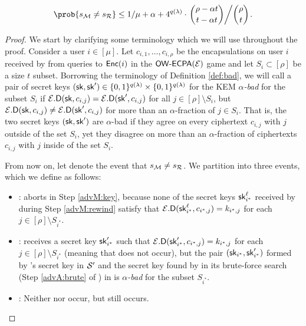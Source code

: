 \begin{lemma}\label{lemma:M}
  \begin{equation}
    \prob{s_{\redM} \ne s_{\redR}}
    \le 1/\mu + \alpha
    + 4^{q(\lambda)} \cdot \left. \binom{\rho - \alpha t}{t - \alpha t} \middle/ \binom{\rho}{t} \right..
  \end{equation}
\end{lemma}

\begin{proof}
  We start by clarifying some terminology which we will use throughout the proof.
  Consider a user \(i \in [\mu]\). Let \(c_{i,1}, \ldots, c_{i,\rho}\) be the encapsulations
  on user \(i\) received by \advA from queries to \(\mathsf{Enc}(i)\) in the
  \(\mathsf{OW}\text{-}\mathsf{ECPA}(\mathcal{E})\) game and let \(S_{i} \subset [\rho]\) be a size \(t\) subset.
  Borrowing the terminology of Definition \ref{def:bad},
  we will call a pair of secret keys \((\mathsf{sk}, \mathsf{sk}') \in \{0,1\}^{q(\lambda)} \times \{0,1\}^{q(\lambda)}\) for the KEM \KEM
  \emph{\(\alpha\)-bad} for the subset \(S_{i}\) if \(\mathcal{E}.\mathsf{D}(\mathsf{sk}, c_{i,j}) = \mathcal{E}.\mathsf{D}(\mathsf{sk}', c_{i,j})\)
  for all \(j \in [\rho] \setminus S_{i}\),
  but \(\mathcal{E}.\mathsf{D}(\mathsf{sk}, c_{i,j}) \ne \mathcal{E}.\mathsf{D}(\mathsf{sk}', c_{i,j})\) for more than an \(\alpha\)-fraction of \(j \in S_{i}\).
  That is, the two secret keys \((\mathsf{sk},\mathsf{sk}')\) are \(\alpha\)-bad if they agree
  on every ciphertext \(c_{i,j}\) with \(j\) outside of the set \(S_{i}\),
  yet they disagree on more than an \(\alpha\)-fraction of ciphertexts
  \(c_{i,j}\) with \(j\) inside of the set \(S_{i}\).

  From now on, let \eventE denote the event that \(s_{\redM} \ne s_{\redR}\).
  We partition \eventE into three events, which we define as follows:
  \begin{itemize}[label={\textbullet},itemsep=0.1cm]
    \item {}: \redM aborts in Step \ref{advM:key},
          because none of the secret keys \(\mathsf{sk}_{i^{*}}^{\ell}\) received by \redM during Step \ref{advM:rewind}
          satisfy that \(\mathcal{E}.\mathsf{D}(\mathsf{sk}_{i^{*}}^{\ell},c_{i^{*},j}) = k_{i^{*},j}\) for each \(j \in [\rho] \setminus S_{i^{*}}\).
    \item {}: \redM receives a secret key \(\mathsf{sk}_{i^{*}}'\) such that
          \(\mathcal{E}.\mathsf{D}(\mathsf{sk}_{i^{*}}',c_{i^{*},j}) = k_{i^{*},j}\) for each \(j \in [\rho] \setminus S_{i^{*}}\)
          (meaning that  does not occur),
          but the pair \((\mathsf{sk}_{i^{*}}, \mathsf{sk}_{i^{*}}')\) formed by \redM's secret key in \(\mathcal{S}'\)
          and the secret key found by \advA in its brute-force search (Step \ref{advA:brute} of \advA)
          in \Simple is \emph{\(\alpha\)-bad} for the subset \(S_{i^{*}}\).
    \item {}: Neither  nor  occur, but \eventE still occurs.
  \end{itemize}


\end{proof}
